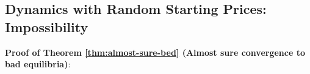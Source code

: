 \documentclass[11pt,a4paper]{article}
\newtheorem{theorem}{Theorem}[section]
\begin{document}
\subsection{Dynamics with Random Starting Prices: Impossibility}
\label{app:dynamic-random-prices-impossibility}

\noindent \textbf{Proof of Theorem \ref{thm:almost-sure-bed} (Almost sure convergence to bad equilibria)}:\\


\end{document}
